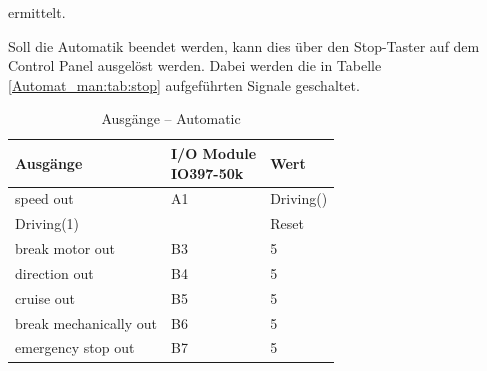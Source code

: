 ermittelt.

Soll die Automatik beendet werden, kann dies über den Stop-Taster auf dem Control Panel ausgelöst werden. Dabei werden die in Tabelle \ref{Automat_man:tab:stop} aufgeführten Signale geschaltet.

\pagebreak[1]
\begin{table}[!ht]
	\centering
	\caption{Ausgänge – Automatic}
	\label{Automat_man:tab:automatic}
	\begin{tabular}{lll}
		\hline
		\textbf{Ausgänge}                           & \makecell{\textbf{I/O Module}             \\ \textbf{IO397-50k}}                 & \textbf{Wert} \\ \hline
		\multicolumn{1}{l|}{speed out}              & \multicolumn{1}{l|}{A1}       & Driving() \\
		\multicolumn{1}{l|}{Driving(1)}             & \multicolumn{1}{l|}{}         & Reset     \\
		\multicolumn{1}{l|}{break motor out}        & \multicolumn{1}{l|}{B3}       & 5         \\
		\multicolumn{1}{l|}{direction out}          & \multicolumn{1}{l|}{B4}       & 5         \\
		\multicolumn{1}{l|}{cruise out}             & \multicolumn{1}{l|}{B5}       & 5         \\
		\multicolumn{1}{l|}{break mechanically out} & \multicolumn{1}{l|}{B6}       & 5         \\
		\multicolumn{1}{l|}{emergency stop out}     & \multicolumn{1}{l|}{B7}       & 5         \\ \hline
	\end{tabular}
\end{table}
\pagebreak[2]




